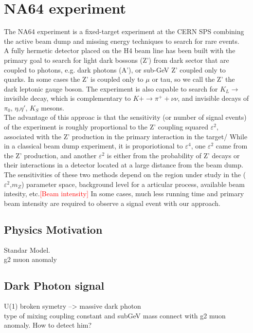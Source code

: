 \section{NA64 experiment} 
The NA64 experiment is a fixed-target experiment at the CERN SPS combining the
active beam dump and missing energy techniques to search for rare events.\\ A
fully hermetic detector placed on the H4 beam line has been built with the
primary goal to search for light dark bossons (Z') from dark sector that are
coupled to photons, e.g. dark photons (A'), or sub-GeV Z' coupled only to
quarks. In some cases the Z' is coupled only to $\mu$ or tau, so we call the Z'
the dark leptonic gauge boson. The experiment is also capable to search for $K_L
\rightarrow $invisible decay, which is complementary to $K+\rightarrow \pi^+ +
\nu \nu$, and invisible decays of $\pi_0$, $\eta$,$\eta'$, $K_S$ mesons.\\ The
advantage of this approac is that the sensitivity (or number of signal events)
of the experiment is roughly proportional to the Z' coupling squared
$\varepsilon^2$, associated with the Z' production in the primary interaction in
the target/ While in a classical beam dump experiment, it is proporiotional to
$\varepsilon^4$, one $\varepsilon^2$ came from the Z' production, and another
$\varepsilon^2$ is either from the probability of Z' decays or their
interactions in a detector located at a large distance from the beam dump.\\ The
sensitivities of these two methods depend on the region under study in the
($\varepsilon^2$,$m_Z$) parameter space, background level for a articular
process, available beam intesity, etc.\textcolor{red}{[Beam intensity]} In some
cases, much less running time and primary beam intensity are required to observe
a signal event with our approach.\\


\subsection{Physics Motivation}
Standar Model.\\
g2 muon anomaly\\

\subsection{Dark Photon signal}
U(1) broken symetry --> massive dark photon\\
type of mixing
coupling constant and subGeV mass connect with g2 muon anomaly.
How to detect him?

